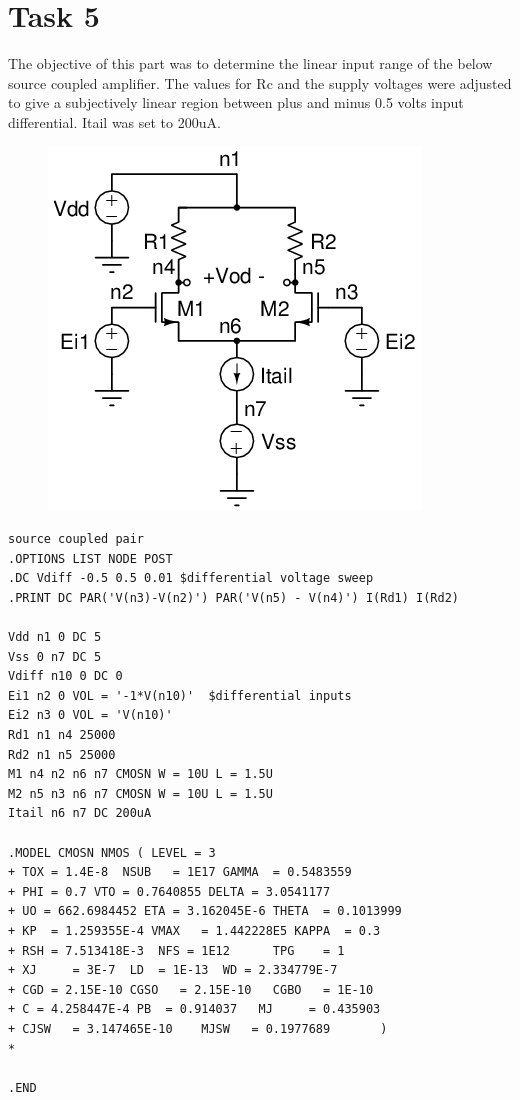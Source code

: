 \documentclass[12pt]{article}
\begin{document}
\section*{Task 5}
The objective of this part was to determine the linear input range of the below source coupled amplifier. The values for Rc and the supply voltages were adjusted to give a subjectively linear region between plus and minus 0.5 volts input differential. Itail was set to 200uA.
\FloatBarrier
\begin{figure}[h!]
\begin{center}
 \includegraphics[scale=0.7]{./5.png}
\end{center}
\end{figure}
\FloatBarrier
\begin{lstlisting}
source coupled pair
.OPTIONS LIST NODE POST
.DC Vdiff -0.5 0.5 0.01 $differential voltage sweep
.PRINT DC PAR('V(n3)-V(n2)') PAR('V(n5) - V(n4)') I(Rd1) I(Rd2)

Vdd n1 0 DC 5 
Vss 0 n7 DC 5
Vdiff n10 0 DC 0
Ei1 n2 0 VOL = '-1*V(n10)'	$differential inputs
Ei2 n3 0 VOL = 'V(n10)'		
Rd1 n1 n4 25000
Rd2 n1 n5 25000
M1 n4 n2 n6 n7 CMOSN W = 10U L = 1.5U
M2 n5 n3 n6 n7 CMOSN W = 10U L = 1.5U
Itail n6 n7 DC 200uA

.MODEL CMOSN NMOS ( LEVEL = 3 
+ TOX = 1.4E-8  NSUB   = 1E17 GAMMA  = 0.5483559          
+ PHI = 0.7 VTO = 0.7640855 DELTA = 3.0541177 
+ UO = 662.6984452 ETA = 3.162045E-6 THETA  = 0.1013999          
+ KP  = 1.259355E-4 VMAX   = 1.442228E5 KAPPA  = 0.3             
+ RSH = 7.513418E-3  NFS = 1E12      TPG    = 1                     
+ XJ     = 3E-7  LD  = 1E-13  WD = 2.334779E-7
+ CGD = 2.15E-10 CGSO   = 2.15E-10   CGBO   = 1E-10        
+ C = 4.258447E-4 PB  = 0.914037   MJ     = 0.435903 
+ CJSW   = 3.147465E-10    MJSW   = 0.1977689       )                                     
*

.END
\end{lstlisting}
\end{document}
